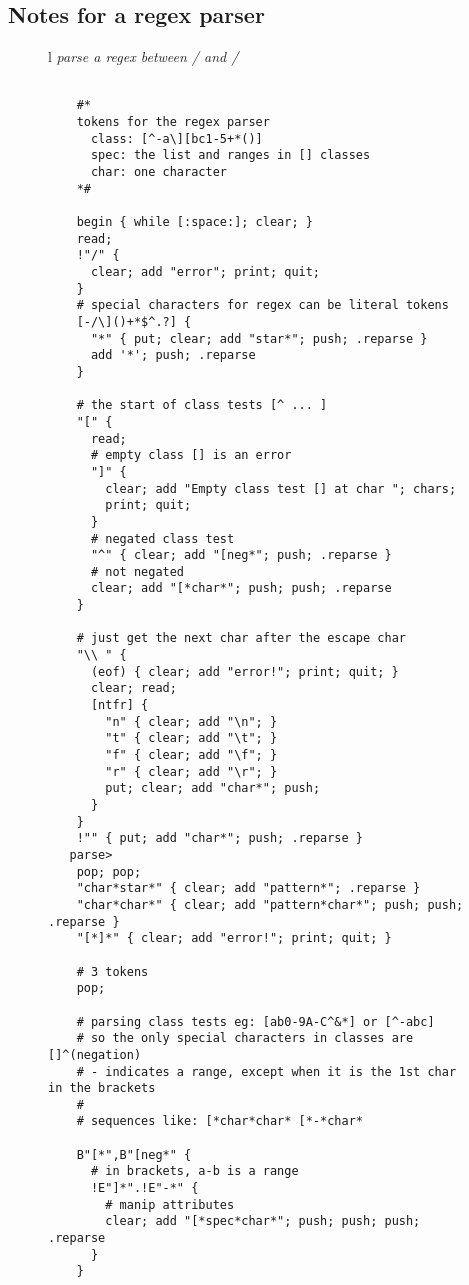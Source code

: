 \documentclass[a4paper,12pt]{article}
\begin{document}
\subsection{Notes for a regex parser}
 \begin{figure}
 \begin{tabular}{ l }
 \emph{ parse a regex between / and /  } \\ 
 \begin{lstlisting}[breaklines] 

    #*
    tokens for the regex parser
      class: [^-a\][bc1-5+*()]
      spec: the list and ranges in [] classes
      char: one character 
    *#

    begin { while [:space:]; clear; }
    read;
    !"/" { 
      clear; add "error"; print; quit;
    }
    # special characters for regex can be literal tokens
    [-/\]()+*$^.?] {
      "*" { put; clear; add "star*"; push; .reparse }
      add '*'; push; .reparse
    }

    # the start of class tests [^ ... ]
    "[" {
      read; 
      # empty class [] is an error
      "]" { 
        clear; add "Empty class test [] at char "; chars;
        print; quit;
      }
      # negated class test
      "^" { clear; add "[neg*"; push; .reparse }
      # not negated
      clear; add "[*char*"; push; push; .reparse
    }

    # just get the next char after the escape char 
    "\\ " { 
      (eof) { clear; add "error!"; print; quit; } 
      clear; read; 
      [ntfr] { 
        "n" { clear; add "\n"; }
        "t" { clear; add "\t"; }
        "f" { clear; add "\f"; }
        "r" { clear; add "\r"; }
        put; clear; add "char*"; push; 
      }
    }
    !"" { put; add "char*"; push; .reparse }
   parse>
    pop; pop;
    "char*star*" { clear; add "pattern*"; .reparse }
    "char*char*" { clear; add "pattern*char*"; push; push; .reparse }
    "[*]*" { clear; add "error!"; print; quit; } 

    # 3 tokens
    pop;
    
    # parsing class tests eg: [ab0-9A-C^&*] or [^-abc]
    # so the only special characters in classes are []^(negation)
    # - indicates a range, except when it is the 1st char in the brackets
    #
    # sequences like: [*char*char* [*-*char*

    B"[*",B"[neg*" {
      # in brackets, a-b is a range
      !E"]*".!E"-*" {
        # manip attributes
        clear; add "[*spec*char*"; push; push; push; .reparse
      }
    }
    

\end{lstlisting}
\end{tabular}
\end{figure}
\end{document}
